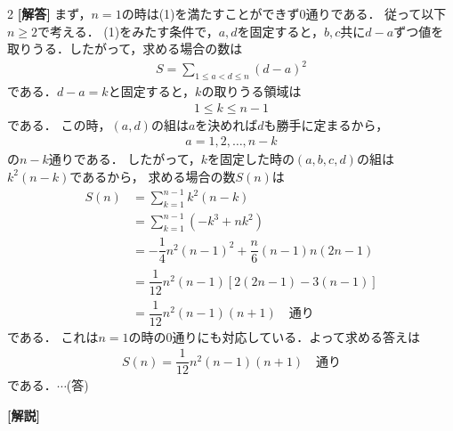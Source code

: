 \documentclass[../../main.tex]{subfiles}
\begin{document}
\setcounter{equation}{0}
\begin{oframed}
  
\end{oframed}
\setlength{\columnseprule}{0.4pt}
\begin{multicols}{2}
  {\bf [解答]}
  まず，$n=1$の時は(1)を満たすことができず$0$通りである．
  従って以下$n\ge 2$で考える．
  (1)をみたす条件で，$a,d$を固定すると，$b,c$共に$d-a$ずつ値を取りうる．したがって，求める場合の数は
  \begin{align}
    S = \sum_{1 \le a < d \le n} (d-a)^2
  \end{align}
  である．$d-a = k$と固定すると，$k$の取りうる領域は
  \begin{align}
    1 \le k \le n-1
  \end{align}
  である．
  この時，$(a,d)$の組は$a$を決めれば$d$も勝手に定まるから，
  \begin{align}
    a=1,2,\dots,n-k
  \end{align}
  の$n-k$通りである．
  したがって，$k$を固定した時の$(a,b,c,d)$の組は$k^2(n-k)$であるから，
  求める場合の数$S(n)$は
  \begin{align}
    S(n)
    & = \sum_{k=1}^{n-1} k^2(n-k)                        \\
    & = \sum_{k=1}^{n-1} (-k^3+nk^2)                     \\
    & = -\dfrac{1}{4}n^2(n-1)^2 + \dfrac{n}{6}(n-1)n(2n-1) \\
    & = \dfrac{1}{12}n^2(n-1)[2(2n-1)-3(n-1)]             \\
    & = \dfrac{1}{12}n^2(n-1)(n+1) \quad \text{通り}
  \end{align}
  である．
  これは$n=1$の時の0通りにも対応している．よって求める答えは
  \begin{align}
    S(n) = \dfrac{1}{12}n^2(n-1)(n+1) \quad \text{通り}
  \end{align}
  である．$\cdots$(答)

  {\bf [解説]}
  \newpage
\end{multicols}
\end{document}
